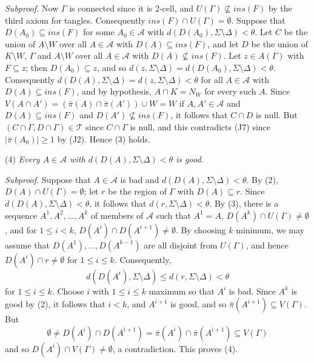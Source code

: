 \textit{Subproof.} Now $\Gamma$ is connected since it is 2-cell, and $U(\Gamma) \not\subseteq ins(F)$ by the third axiom for tangles. Consequently $ins(F) \cap U(\Gamma) = \emptyset$. Suppose that $D(A_0) \subseteq ins(F)$ for some $A_0 \in \mathcal{A}$ with $d(D(A_0), \Sigma \setminus \Delta) < \theta$. Let $C$ be the union of $A \setminus W$ over all $A \in \mathcal{A}$ with $D(A) \subseteq ins(F)$, and let $D$ be the union of $K \setminus W$, $\Gamma$ and $A \setminus W$ over all $A \in \mathcal{A}$ with $D(A) \not\subseteq ins(F)$. Let $z \in A(\Gamma)$ with $F \subseteq z$; then $D(A_0) \subseteq z$, and so $d(z, \Sigma \setminus \Delta) = d(D(A_0), \Sigma \setminus \Delta) < \theta$. Consequently $d(D(A), \Sigma \setminus \Delta) = d(z, \Sigma \setminus \Delta) < \theta$ for all $A \in \mathcal{A}$ with $D(A) \subseteq ins(F)$, and by hypothesis, $A \cap K = N_W$ for every such $A$. Since $V(A \cap A') = (\bar{\pi}(A) \cap \bar{\pi}(A')) \cup W = W$ if $A, A' \in \mathcal{A}$ and $D(A) \subseteq ins(F)$ and $D(A') \not\subseteq ins(F)$, it follows that $C \cap D$ is null. But $(C \cap \Gamma, D \cap \Gamma) \in \mathcal{T}$ since $C \cap \Gamma$ is null, and this contradicts (J7) since $|\bar{\pi}(A_0)| \ge 1$ by (J2). Hence (3) holds.

\hspace*{12pt}(4) \textit{Every $A \in \mathcal{A}$ with $d(D(A), \Sigma \setminus \Delta) < \theta$ is good.}

\textit{Subproof.} Suppose that $A \in \mathcal{A}$ is bad and $d(D(A), \Sigma \setminus \Delta) < \theta$. By (2), $D(A) \cap U(\Gamma) = \emptyset$; let $r$ be the region of $\Gamma$ with $D(A) \subseteq r$. Since $d(D(A), \Sigma \setminus \Delta) < \theta$, it follows that $d(r, \Sigma \setminus \Delta) < \theta$. By (3), there is a sequence $A^1, A^2, \dots, A^k$ of members of $\mathcal{A}$ such that $A^1 = A$, $D(A^k) \cap U(\Gamma) \ne \emptyset$, and for $1 \le i < k$, $D(A^i) \cap D(A^{i+1}) \ne \emptyset$. By choosing $k$ minimum, we may assume that $D(A^1), \dots, D(A^{k-1})$ are all disjoint from $U(\Gamma)$, and hence $D(A^i) \cap r \ne \emptyset$ for $1 \le i \le k$. Consequently,
\begin{equation*}
d(D(A^i), \Sigma \setminus \Delta) \le d(r, \Sigma \setminus \Delta) < \theta
\end{equation*}
for $1 \le i \le k$. Choose $i$ with $1 \le i \le k$ maximum so that $A^i$ is bad. Since $A^k$ is good by (2), it follows that $i < k$, and $A^{i+1}$ is good, and so $\bar{\pi}(A^{i+1}) \subseteq V(\Gamma)$. But
\begin{equation*}
\emptyset \ne D(A^i) \cap D(A^{i+1}) = \bar{\pi}(A^i) \cap \bar{\pi}(A^{i+1}) \subseteq V(\Gamma)
\end{equation*}
and so $D(A^i) \cap V(\Gamma) \ne \emptyset$, a contradiction. This proves (4).

